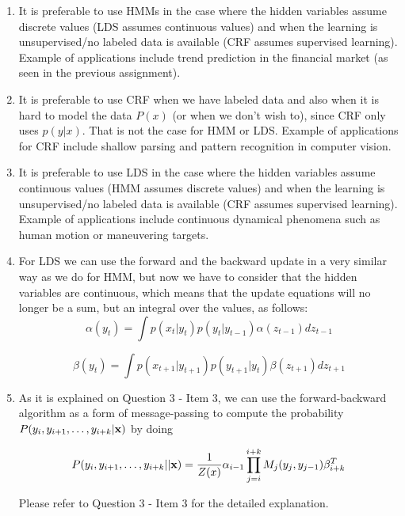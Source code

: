 \documentclass{article}
\begin{document}
\begin{enumerate}
\item
It is preferable to use HMMs in the case where the hidden variables assume discrete values (LDS assumes continuous values) and when the learning is unsupervised/no labeled data is available (CRF assumes supervised learning).
Example of applications include trend prediction in the financial market (as seen in the previous assignment).
\item
It is preferable to use CRF when we have labeled data and also when it is hard to model the data $P(x)$ (or when we don't wish to), since CRF only uses $p(y|x)$. That is not the case for HMM or LDS. 
Example of applications for CRF include shallow parsing and pattern recognition in computer vision.
\item
It is preferable to use LDS in the case where the hidden variables assume continuous values (HMM assumes discrete values) and when the learning is unsupervised/no labeled data is available (CRF assumes supervised learning). 
Example of applications include continuous dynamical phenomena such as human motion or maneuvering targets.
\item
For LDS we can use the forward and the backward update in a very similar way as we do for HMM, but now we have to consider that the hidden variables are continuous, which means that the update equations will no longer be a sum, but an integral over the values, as follows:
\begin{equation*}
\alpha(y_t) = \int p(x_t|y_t)p(y_t|y_{t-1})\alpha(z_{t-1})dz_{t-1}
\end{equation*}

\begin{equation*}
\beta(y_t) = \int p(x_{t+1}|y_{t+1})p(y_{t+1}|y_t)\beta(z_{t+1})dz_{t+1}
\end{equation*}
\item
As it is explained on Question 3 - Item 3, we can use the forward-backward algorithm as a form of message-passing to compute the probability $P(y_i, y_{i+1}, \dots, y_{i+k} | {\bf x})$ by doing

\begin{equation*}
P(y_i, y_{i+1}, \dots, y_{i+k} | | {\bf x}) = \frac{1}{Z(x)}\alpha_{i-1} \prod_{j=i}^{i+k} M_j(y_j, y_{j-1}) \beta_{i+k}^T
\end{equation*}

Please refer to Question 3 - Item 3 for the detailed explanation.

\end{enumerate}
\end{document}
